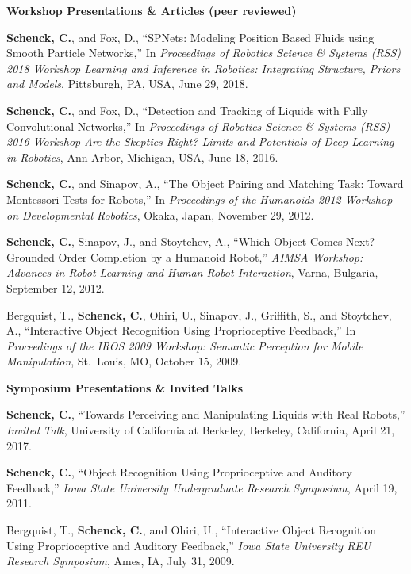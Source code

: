 \documentclass[10pt]{article}
\newcommand{\halfblankline}{\quad\vspace{-0.9\baselineskip}\pagebreak[3]}
\begin{document}
\begin{outerlist}
\item[] \textbf{Workshop Presentations \& Articles (peer reviewed)}
	\begin{innerlist}
	\item \textbf{Schenck, C.}, and Fox, D., ``SPNets: Modeling Position Based Fluids using Smooth Particle Networks,'' In \emph{Proceedings of Robotics Science \& Systems (RSS) 2018 Workshop Learning and Inference in Robotics: Integrating Structure, Priors and Models}, Pittsburgh, PA, USA, June 29, 2018.
	\item \textbf{Schenck, C.}, and Fox, D., ``Detection and Tracking of Liquids with Fully Convolutional Networks,'' In \emph{Proceedings of Robotics Science \& Systems (RSS) 2016 Workshop Are the Skeptics Right? Limits and Potentials of Deep Learning in Robotics}, Ann Arbor, Michigan, USA, June 18, 2016.
	\item \textbf{Schenck, C.}, and Sinapov, A., ``The Object Pairing and Matching Task: Toward Montessori Tests for Robots,'' In \emph{Proceedings of the Humanoids 2012 Workshop on Developmental Robotics}, Okaka, Japan, November 29, 2012.
	\item \textbf{Schenck, C.}, Sinapov, J., and Stoytchev, A., ``Which Object Comes Next? Grounded Order Completion by a Humanoid Robot,'' \emph{AIMSA Workshop: Advances in Robot Learning and Human-Robot Interaction}, Varna, Bulgaria, September 12, 2012.
	\item Bergquist, T., \textbf{Schenck, C.}, Ohiri, U., Sinapov, J., Griffith, S., and Stoytchev, A., ``Interactive Object Recognition Using Proprioceptive Feedback,'' In \emph{Proceedings of the IROS 2009 Workshop: Semantic Perception for Mobile Manipulation}, St.~Louis, MO, October 15, 2009.
	\end{innerlist}

\halfblankline

\item[] \textbf{Symposium Presentations \& Invited Talks}
	\begin{innerlist}
	    \item \textbf{Schenck, C.}, ``Towards Perceiving and Manipulating Liquids with Real Robots,'' \emph{Invited Talk}, University of California at Berkeley, Berkeley, California, April 21, 2017.
		\item \textbf{Schenck, C.}, ``Object Recognition Using Proprioceptive and Auditory Feedback,'' \emph{Iowa State University Undergraduate Research Symposium}, April 19, 2011.
		\item Bergquist, T., \textbf{Schenck, C.}, and Ohiri, U., ``Interactive Object Recognition Using Proprioceptive and Auditory Feedback,'' \emph{Iowa State University REU Research Symposium}, Ames, IA, July 31, 2009.
	\end{innerlist}

\end{outerlist}
\end{document}
